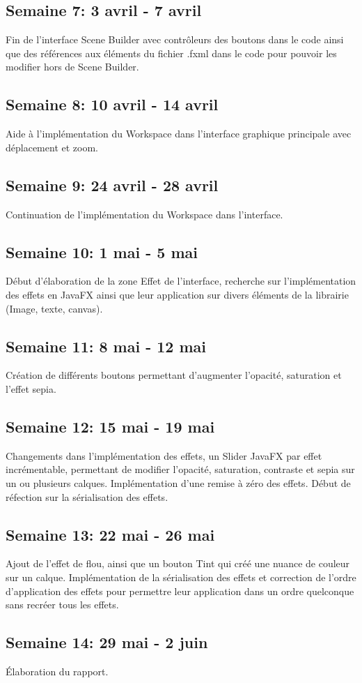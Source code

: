 \subsection{Semaine 7: 3 avril - 7 avril}
Fin de l'interface Scene Builder avec contrôleurs des boutons dans le code ainsi que des références aux éléments du fichier \og .fxml \fg{} dans le code pour pouvoir les modifier hors de Scene Builder.
\subsection{Semaine 8: 10 avril - 14 avril}
Aide à l'implémentation du Workspace dans l'interface graphique principale avec déplacement et zoom.
\subsection{Semaine 9: 24 avril - 28 avril}
Continuation de l'implémentation du Workspace dans l'interface.
\subsection{Semaine 10: 1 mai - 5 mai}
Début d'élaboration de la zone \og Effet \fg{} de l'interface, recherche sur l'implémentation des effets en JavaFX ainsi que leur application sur divers éléments de la librairie (Image, texte, canvas).
\subsection{Semaine 11: 8 mai - 12 mai} 
Création de différents boutons permettant d'augmenter l'opacité, saturation et l'effet sepia. 
\subsection{Semaine 12: 15 mai - 19 mai}
Changements dans l'implémentation des effets, un \og Slider \fg{} JavaFX par effet incrémentable, permettant de modifier l'opacité, saturation, contraste et sepia sur un ou plusieurs calques. Implémentation d'une remise à zéro des effets. Début de réfection sur la sérialisation des effets.
\subsection{Semaine 13: 22 mai - 26 mai}
Ajout de l'effet de flou, ainsi que un bouton \og Tint \fg{} qui créé une nuance de couleur sur un calque. Implémentation de la sérialisation des effets et correction de l'ordre d'application des effets pour permettre leur application dans un ordre quelconque sans recréer tous les effets.
\subsection{Semaine 14: 29 mai - 2 juin}
Élaboration du rapport.




